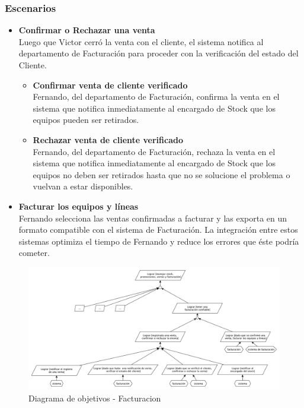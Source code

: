 \subsubsection{Escenarios}

\begin{itemize}
  \item \textbf{Confirmar o Rechazar una venta} \\
    Luego que Victor cerró la venta con el cliente, el sistema notifica al departamento de Facturación para proceder con la verificación del estado del Cliente.
  \begin{itemize}
    \item \textbf{Confirmar venta de cliente verificado} \\
      Fernando, del departamento de Facturación, confirma la venta en el sistema que notifica inmediatamente al encargado de Stock que los equipos pueden ser retirados.
    \item \textbf{Rechazar venta de cliente verificado} \\
      Fernando, del departamento de Facturación, rechaza la venta en el sistema que notifica inmediatamente al encargado de Stock que los equipos no deben ser retirados hasta que no se solucione el problema o vuelvan a estar disponibles.
  \end{itemize}

  \item \textbf{Facturar los equipos y líneas} \\
    Fernando selecciona las ventas confirmadas a facturar y las exporta en un formato compatible con el sistema de Facturación. La integración entre estos sistemas optimiza el tiempo de Fernando y reduce los errores que éste podría cometer.
\end{itemize}

\begin{figure}[h!]
  \centering
  \includegraphics[width=1\textwidth]{./imagenes/facturacion.pdf}
  \caption{Diagrama de objetivos - Facturacion}
\end{figure}


